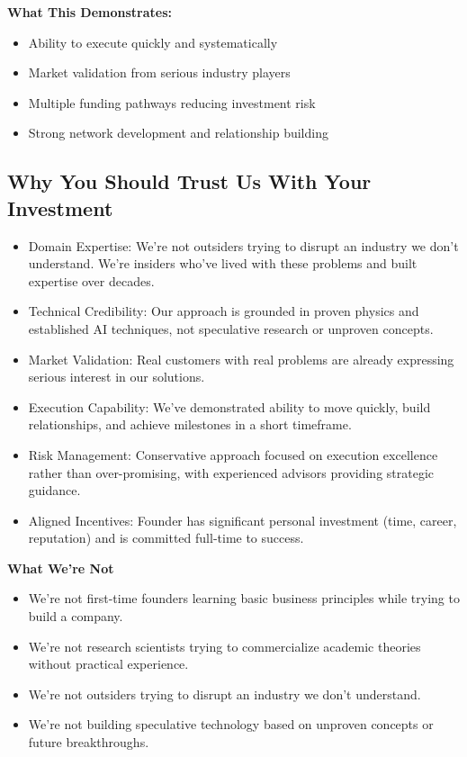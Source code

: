 \documentclass[11pt,letterpaper]{article}
\begin{document}
\textbf{What This Demonstrates:}
\begin{itemize}[leftmargin=10pt, itemsep=1pt]
    \item Ability to execute quickly and systematically
    \item Market validation from serious industry players
    \item Multiple funding pathways reducing investment risk
    \item Strong network development and relationship building
\end{itemize}

\subsection*{Why You Should Trust Us With Your Investment}

\begin{itemize}[leftmargin=10pt, itemsep=1pt]
    \item Domain Expertise: We're not outsiders trying to disrupt an industry we don't understand. We're insiders who've lived with these problems and built expertise over decades.
    \item Technical Credibility: Our approach is grounded in proven physics and established AI techniques, not speculative research or unproven concepts.
    \item Market Validation: Real customers with real problems are already expressing serious interest in our solutions.
    \item Execution Capability: We've demonstrated ability to move quickly, build relationships, and achieve milestones in a short timeframe.
    \item Risk Management: Conservative approach focused on execution excellence rather than over-promising, with experienced advisors providing strategic guidance.
    \item Aligned Incentives: Founder has significant personal investment (time, career, reputation) and is committed full-time to success.
\end{itemize}

\textbf{What We're Not}
\begin{itemize}[leftmargin=10pt, itemsep=1pt]
    \item We're not first-time founders learning basic business principles while trying to build a company.
    \item We're not research scientists trying to commercialize academic theories without practical experience.
    \item We're not outsiders trying to disrupt an industry we don't understand.
    \item We're not building speculative technology based on unproven concepts or future breakthroughs.
\end{itemize}
\end{document}
